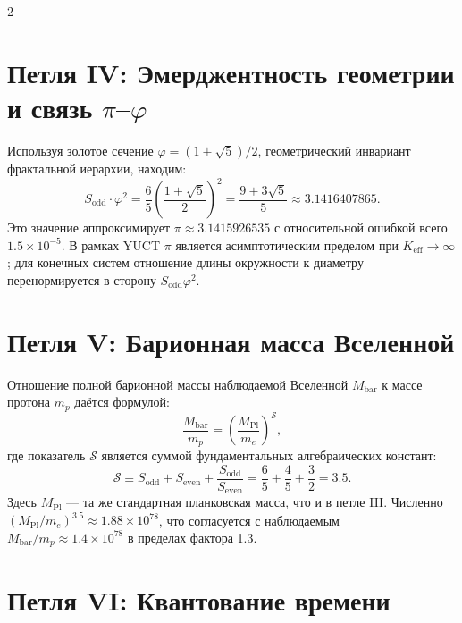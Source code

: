 \documentclass[12pt,a4paper]{article}
\newcommand{\Keff}{K_{\mathrm{eff}}}
\begin{document}
	\begin{multicols}{2}
		\section{Петля IV: Эмерджентность геометрии и связь \(\pi\)–\(\varphi\)}
		
		Используя золотое сечение \(\varphi = (1+\sqrt{5})/2\), геометрический инвариант фрактальной иерархии, находим:
		\begin{equation}
			S_{\mathrm{odd}} \cdot \varphi^2 = \frac{6}{5} \left( \frac{1+\sqrt{5}}{2} \right)^2 = \frac{9+3\sqrt{5}}{5} \approx 3.1416407865.
		\end{equation}
		Это значение аппроксимирует \(\pi \approx 3.1415926535\) с относительной ошибкой всего \(1.5 \times 10^{-5}\). В рамках YUCT \(\pi\) является асимптотическим пределом при \(\Keff \to \infty\); для конечных систем отношение длины окружности к диаметру перенормируется в сторону \(S_{\mathrm{odd}}\varphi^2\).
		
		\section{Петля V: Барионная масса Вселенной}
		
		Отношение полной барионной массы наблюдаемой Вселенной \(M_{\mathrm{bar}}\) к массе протона \(m_p\) даётся формулой:
		\begin{equation}
			\frac{M_{\mathrm{bar}}}{m_p} = \left( \frac{M_{\mathrm{Pl}}}{m_e} \right)^{\mathcal{S}},
		\end{equation}
		где показатель \(\mathcal{S}\) является суммой фундаментальных алгебраических констант:
		\begin{equation}
			\mathcal{S} \equiv S_{\mathrm{odd}} + S_{\mathrm{even}} + \frac{S_{\mathrm{odd}}}{S_{\mathrm{even}}} = \frac{6}{5} + \frac{4}{5} + \frac{3}{2} = 3.5.
		\end{equation}
		Здесь \(M_{\mathrm{Pl}}\) — та же стандартная планковская масса, что и в петле III. Численно \((M_{\mathrm{Pl}}/m_e)^{3.5} \approx 1.88 \times 10^{78}\), что согласуется с наблюдаемым \(M_{\mathrm{bar}}/m_p \approx 1.4 \times 10^{78}\) в пределах фактора 1.3.
		
		\section{Петля VI: Квантование времени}
		

\end{multicols}
\end{document}
